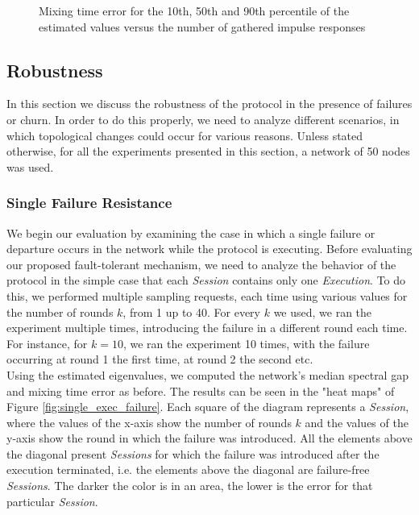 \documentclass[a4paper,11pt,twoside]{report}
\begin{document}
\begin{figure}
\centering
{}
\qquad
{}
\qquad
{}
\caption{Mixing time error for the 10th, 50th and 90th percentile of the estimated values versus the number of gathered impulse responses}
\label{fig:mixing_no_failure}
\end{figure}


\subsection{Robustness}

In this section we discuss the robustness of the protocol in the presence of failures or churn. In order to do this properly, we need to analyze different scenarios, in which topological changes could occur for various reasons. Unless stated otherwise, for all the experiments presented in this section, a network of 50 nodes was used. 

\subsubsection*{Single Failure Resistance}

We begin our evaluation by examining the case in which a single failure or departure occurs in the network while the protocol is executing. Before evaluating our proposed fault-tolerant mechanism, we need to analyze the behavior of the protocol in the simple case that each \textit{Session} contains only one \textit{Execution}. To do this, we performed multiple sampling requests, each time using various values for the number of rounds $k$, from 1 up to 40. For every $k$ we used, we ran the experiment multiple times, introducing the failure in a different round each time. For instance, for $k=10$, we ran the experiment 10 times, with the failure occurring at round 1 the first time, at round 2 the second etc.\\

Using the estimated eigenvalues, we computed the network's median spectral gap and mixing time error as before. The results can be seen in the "heat maps" of Figure \ref{fig:single_exec_failure}. Each square of the diagram represents a \textit{Session}, where the values of the x-axis show the number of rounds $k$ and the values of the y-axis show the round in which the failure was introduced. All the elements above the diagonal present \textit{Sessions} for which the failure was introduced after the execution terminated, i.e. the elements above the diagonal are failure-free \textit{Sessions}. The darker the color is in an area, the lower is the error for that particular \textit{Session}. \\
\end{document}
